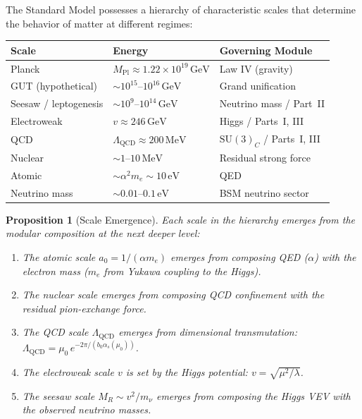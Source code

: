 \documentclass[12pt]{article}
\newtheorem{proposition}[theorem]{Proposition}
\theoremstyle{definition}
\theoremstyle{remark}
\newcommand{\GeV}{\,\mathrm{GeV}}
\newcommand{\MeV}{\,\mathrm{MeV}}
\newcommand{\su}[1]{\mathrm{SU}(#1)}
\newcommand{\Mpl}{M_{\mathrm{Pl}}}
\begin{document}
The Standard Model possesses a hierarchy of characteristic scales that determine the behavior of matter at different regimes:

\begin{center}
\renewcommand{\arraystretch}{1.2}
\begin{tabular}{lll}
\toprule
\textbf{Scale} & \textbf{Energy} & \textbf{Governing Module} \\
\midrule
Planck & $\Mpl \approx 1.22 \times 10^{19}\GeV$ & Law IV (gravity) \\
GUT (hypothetical) & $\sim 10^{15}$--$10^{16}\GeV$ & Grand unification \\
Seesaw / leptogenesis & $\sim 10^{9}$--$10^{14}\GeV$ & Neutrino mass / Part~II \\
Electroweak & $v \approx 246\GeV$ & Higgs / Parts~I, III \\
QCD & $\Lambda_{\mathrm{QCD}} \approx 200\MeV$ & $\su{3}_C$ / Parts~I, III \\
Nuclear & $\sim 1$--$10\MeV$ & Residual strong force \\
Atomic & $\sim \alpha^2 m_e \sim 10\,\mathrm{eV}$ & QED \\
Neutrino mass & $\sim 0.01$--$0.1\,\mathrm{eV}$ & BSM neutrino sector \\
\bottomrule
\end{tabular}
\end{center}

\begin{proposition}[Scale Emergence]
\label{prop:scale-emergence}
Each scale in the hierarchy emerges from the modular composition at the next deeper level:
\begin{enumerate}
\item The atomic scale $a_0 = 1/(\alpha m_e)$ emerges from composing QED ($\alpha$) with the electron mass ($m_e$ from Yukawa coupling to the Higgs).
\item The nuclear scale emerges from composing QCD confinement with the residual pion-exchange force.
\item The QCD scale $\Lambda_{\mathrm{QCD}}$ emerges from dimensional transmutation: $\Lambda_{\mathrm{QCD}} = \mu_0\, e^{-2\pi/(b_0\alpha_s(\mu_0))}$.
\item The electroweak scale $v$ is set by the Higgs potential: $v = \sqrt{\mu^2/\lambda}$.
\item The seesaw scale $M_R \sim v^2/m_\nu$ emerges from composing the Higgs VEV with the observed neutrino masses.
\end{enumerate}
\end{proposition}
\end{document}

